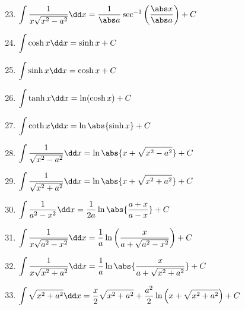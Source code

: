 \parbox[t]{.36\linewidth}{%
\begin{enumerate}\setcounter{enumi}{22}
\item $\ds\int\frac1{x\sqrt{x^2-a^2}}\dd x=\frac1{\abs a}\sec^{-1}\left(\frac{\abs x}{\abs a}\right)+C$
\item $\ds\int\cosh x\dd x=\sinh x+C$
\item $\ds\int\sinh x\dd x=\cosh x+C$
\item $\ds\int\tanh x\dd x=\ln(\cosh x)+C$
\item $\ds\int\coth x\dd x=\ln\abs{\sinh x}+C$
\item $\ds\int\frac1{\sqrt{x^2-a^2}}\dd x=\ln\abs{x+\sqrt{x^2-a^2}}+C\\{\scriptstyle\phantom{1}}$
\item $\ds\int\frac1{\sqrt{x^2+a^2}}\dd x=\ln\abs{x+\sqrt{x^2+a^2}}+C$
\item $\ds\int\frac1{a^2-x^2}\dd x=\frac1{2a}\ln\abs{\frac{a+x}{a-x}}+C$
\item $\ds\int\frac1{x\sqrt{a^2-x^2}}\dd x=\frac1a\ln\left(\frac x{a+\sqrt{a^2-x^2}}\right)+C$
\item $\ds\int\frac1{x\sqrt{x^2+a^2}}\dd x=\frac1a\ln\abs{\frac{x}{a+\sqrt{x^2+a^2}}}+C$
\item $\ds\int\sqrt{x^2+a^2}\dd x=\vphantom{\frac1{x^2}}\\
\null\hfill\ds\frac x2\sqrt{x^2+a^2}+\frac{a^2}2\ln\left(x+\sqrt{x^2+a^2}\right)+C$
\end{enumerate}}
\egroup


\clearpage

